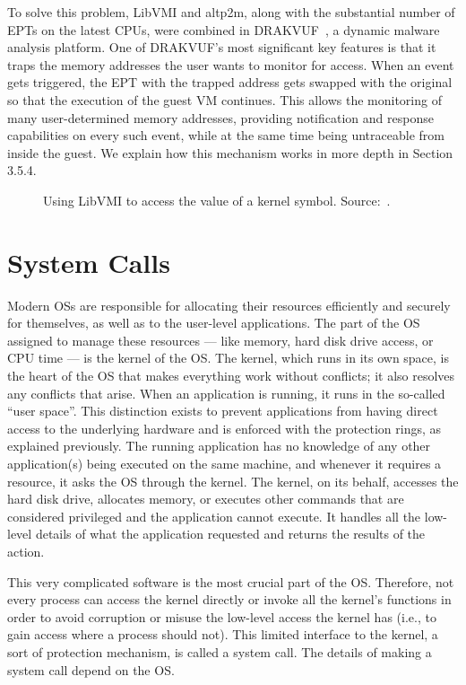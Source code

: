 \par To solve this problem, LibVMI and altp2m, along with the substantial number of \ac{EPT}s on the latest \ac{CPU}s, were combined in DRAKVUF~\cite{lengyel2014drakvuf}, a dynamic malware analysis platform. One of DRAKVUF's most significant key features is that it traps the memory addresses the user wants to monitor for access. When an event gets triggered, the \ac{EPT} with the trapped address gets swapped with the original so that the execution of the guest \ac{VM} continues. This allows the monitoring of many user-determined memory addresses, providing notification and response capabilities on every such event, while at the same time being untraceable from inside the guest. We explain how this mechanism works in more depth in Section 3.5.4.

\begin{figure}[ht]
	\centering
	
	\caption{Using LibVMI to access the value of a kernel symbol. Source:~\cite{libvmi}.}
	\label{fig:accesskernel}
\end{figure}

\section{System Calls}\label{sec:syscalls}
Modern \ac{OS}s are responsible for allocating their resources efficiently and securely for themselves, as well as to the user-level applications. The part of the \ac{OS} assigned to manage these resources --- like memory, hard disk drive access, or \ac{CPU} time --- is the kernel of the \ac{OS}. The kernel, which runs in its own space, is the heart of the \ac{OS} that makes everything work without conflicts; it also resolves any conflicts that arise. When an application is running, it runs in the so-called ``user space''. This distinction exists to prevent applications from having direct access to the underlying hardware and is enforced with the protection rings, as explained previously. The running application has no knowledge of any other application(s) being executed on the same machine, and whenever it requires a resource, it asks the \ac{OS} through the kernel. The kernel, on its behalf, accesses the hard disk drive, allocates memory, or executes other commands that are considered privileged and the application cannot execute. It handles all the low-level details of what the application requested and returns the results of the action. 

\par This very complicated software is the most crucial part of the \ac{OS}. Therefore, not every process can access the kernel directly or invoke all the kernel's functions in order to avoid corruption or misuse the low-level access the kernel has (i.e., to gain access where a process should not). This limited interface to the kernel, a sort of protection mechanism, is called a system call. The details of making a system call depend on the \ac{OS}.

